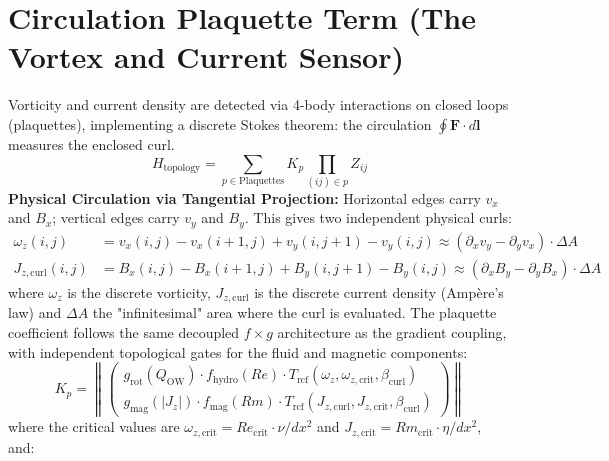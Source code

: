 \documentclass[12pt, a4paper, oneside]{report}
\begin{document}
\section{Circulation Plaquette Term (The Vortex and Current Sensor)}
Vorticity and current density are detected via 4-body interactions on closed loops (plaquettes), implementing a discrete Stokes theorem: the circulation $\oint \mathbf{F} \cdot d\mathbf{l}$ measures the enclosed curl.
\begin{equation}
    H_{\text{topology}} = \sum_{p \in \text{Plaquettes}} K_p \prod_{(ij) \in p} Z_{ij}
\end{equation}
\textbf{Physical Circulation via Tangential Projection:} Horizontal edges carry $v_x$ and $B_x$; vertical edges carry $v_y$ and $B_y$. This gives two independent physical curls:
\begin{align}
    \omega_z(i,j) &= v_x(i,j) - v_x(i{+}1,j) + v_y(i,j{+}1) - v_y(i,j) \approx (\partial_x v_y - \partial_y v_x) \cdot \Delta A \\
    J_{z,\text{curl}}(i,j) &= B_x(i,j) - B_x(i{+}1,j) + B_y(i,j{+}1) - B_y(i,j) \approx (\partial_x B_y - \partial_y B_x) \cdot \Delta A
\end{align}
where $\omega_z$ is the discrete vorticity, $J_{z,\text{curl}}$ is the discrete current density (Amp\`ere's law) and $\Delta A$ the "infinitesimal" area where the curl is evaluated. The plaquette coefficient follows the same decoupled $f \times g$ architecture as the gradient coupling, with independent topological gates for the fluid and magnetic components:
\begin{equation}
    K_p = \left\|\begin{pmatrix} g_{\text{rot}}(Q_{\text{OW}}) \cdot f_{\text{hydro}}(Re) \cdot T_{\text{rcf}}(\omega_z, \omega_{z,\text{crit}}, \beta_{\text{curl}}) \\ g_{\text{mag}}(|J_z|) \cdot f_{\text{mag}}(Rm) \cdot T_{\text{rcf}}(J_{z,\text{curl}}, J_{z,\text{crit}}, \beta_{\text{curl}}) \end{pmatrix}\right\|
\end{equation}
where the critical values are $\omega_{z,\text{crit}} = Re_{\text{crit}} \cdot \nu / dx^2$ and $J_{z,\text{crit}} = Rm_{\text{crit}} \cdot \eta / dx^2$, and:
\end{document}
